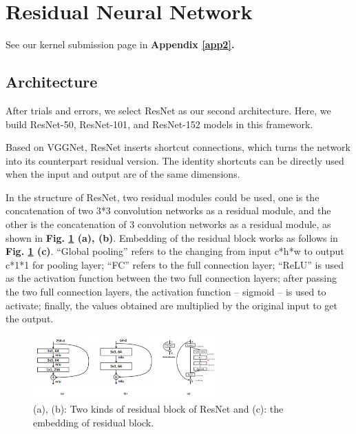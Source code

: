 \documentclass[10pt,twocolumn,letterpaper]{article}
\begin{document}

\section{Residual Neural Network} \label{SECRES}

See our kernel submission page in \textbf{Appendix \ref{app2}.}

\subsection{Architecture}

After trials and errors, we select \textsf{ResNet} as our second architecture. Here, we build \textsf{ResNet-50}, \textsf{ResNet-101}, and \textsf{ResNet-152} models in this framework. 

Based on \textsf{VGGNet}, \textsf{ResNet} inserts shortcut connections, which turns the network into its counterpart residual version. The identity shortcuts can be directly used when the input and output are of the same dimensions. 

In the structure of \textsf{ResNet}, two residual modules could be used, one is the concatenation of two 3*3 convolution networks as a residual module, and the other is the concatenation of 3 convolution networks as a residual module, as shown in \textbf{Fig. \ref{resblock} (a), (b)}. Embedding of the residual block works as follows in \textbf{Fig. \ref{resblock} (c)}. ``Global pooling'' refers to the changing from input c*h*w to output c*1*1 for pooling layer; ``FC'' refers to the full connection layer; ``ReLU'' is used as the activation function between the two full connection layers; after passing the two full connection layers, the activation function -- sigmoid -- is used to activate; finally, the values obtained are multiplied by the original input to get the output. 

\begin{figure}[h]
\centering
\includegraphics[width=7cm]{resblock.pdf}
\caption{(a), (b): Two kinds of residual block of \textsf{ResNet} and (c): the embedding of residual block.}
\label{resblock}
\end{figure}
\end{document}
